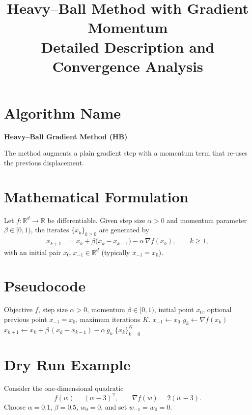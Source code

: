 \documentclass{article}
\newcommand{\grad}{\nabla}
\begin{document}
\title{Heavy–Ball Method with Gradient Momentum \\ Detailed Description and Convergence Analysis}
\author{}
\date{}
\maketitle

\section*{Algorithm Name}
\textbf{Heavy–Ball Gradient Method (HB)}  

The method augments a plain gradient step with a momentum term that re‑uses the previous displacement.

\section*{Mathematical Formulation}
Let $f:\mathbb{R}^d\to\mathbb{R}$ be differentiable.  
Given step size $\alpha>0$ and momentum parameter $\beta\in[0,1)$, the iterates $\{x_k\}_{k\ge 0}$ are generated by
\begin{align}
    x_{k+1}
    &= x_k + \beta\bigl(x_k-x_{k-1}\bigr) - \alpha \,\grad f(x_k),
    \qquad k\ge 1,
    \label{eq:update}
\end{align}
with an initial pair $x_{0},x_{-1}\in\mathbb{R}^d$ (typically $x_{-1}=x_0$).

\section*{Pseudocode}
\begin{algorithm}[H]
\caption{Heavy–Ball Gradient Method}
\begin{algorithmic}[1]
\Require Objective $f$, step size $\alpha>0$, momentum $\beta\in[0,1)$,
        initial point $x_0$, optional previous point $x_{-1}=x_0$,
        maximum iterations $K$.
\State $x_{-1}\gets x_0$ 
    \State $g_k \gets \grad f(x_k)$
    \State $x_{k+1} \gets x_k + \beta\,(x_k-x_{k-1}) - \alpha\, g_k$
\EndFor
\State \Return $\{x_k\}_{k=0}^{K}$
\end{algorithmic}
\end{algorithm}

\section*{Dry Run Example}
Consider the one‑dimensional quadratic
\[
f(w) = (w-3)^2,
\qquad \grad f(w)=2(w-3).
\]
Choose $\alpha = 0.1$, $\beta = 0.5$, $w_0=0$, and set $w_{-1}=w_0=0$.
\end{document}
